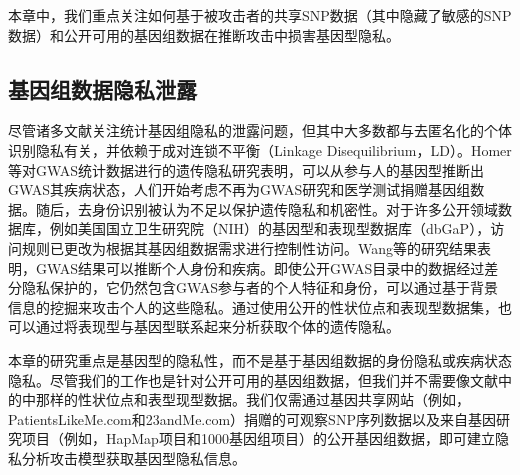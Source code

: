 本章中，我们重点关注如何基于被攻击者的共享SNP数据（其中隐藏了敏感的SNP数据）和公开可用的基因组数据在推断攻击中损害基因型隐私。

\subsection{基因组数据隐私泄露}

尽管诸多文献关注统计基因组隐私的泄露问题，但其中大多数都与去匿名化的个体识别隐私有关，并依赖于成对连锁不平衡（Linkage Disequilibrium，LD）。Homer等\cite{homer2008resolving}对GWAS统计数据进行的遗传隐私研究表明，可以从参与人的基因型推断出GWAS其疾病状态，人们开始考虑不再为GWAS研究和医学测试捐赠基因组数据。随后，去身份识别被认为不足以保护遗传隐私和机密性。对于许多公开领域数据库，例如美国国立卫生研究院（NIH）的基因型和表现型数据库（dbGaP）\cite{mailman2007ncbi,nhgri2015privacy}，访问规则已更改为根据其基因组数据需求进行控制性访问。Wang等\cite{wang2009learning}的研究结果表明，GWAS结果可以推断个人身份和疾病。即使公开GWAS目录中的数据经过差分隐私保护的，它仍然包含GWAS参与者的个人特征和身份，可以通过基于背景信息的挖掘来攻击个人的这些隐私\cite{wang2016infringement}。通过使用公开的性状位点和表现型数据集，也可以通过将表现型与基因型联系起来分析获取个体的遗传隐私\cite{harmanci2016quantification}。

本章的研究重点是基因型的隐私性，而不是基于基因组数据的身份隐私\cite{wang2009learning,wang2016infringement}或疾病状态隐私\cite{homer2008resolving,wang2009learning}。尽管我们的工作也是针对公开可用的基因组数据，但我们并不需要像文献\cite{wang2009learning,wang2016infringement,harmanci2016quantification}中的中那样的性状位点和表型现型数据。我们仅需通过基因共享网站（例如，PatientsLikeMe.com和23andMe.com）捐赠的可观察SNP序列数据以及来自基因研究项目（例如，HapMap项目和1000基因组项目）的公开基因组数据，即可建立隐私分析攻击模型获取基因型隐私信息。


